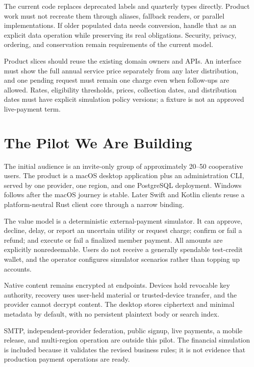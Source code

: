 \documentclass[11pt]{article}
\begin{document}
The current code replaces deprecated labels and quarterly types directly.
Product work must not recreate them through aliases, fallback readers, or parallel
implementations. If older populated data needs conversion, handle that as an
explicit data operation while preserving its real obligations. Security, privacy,
ordering, and conservation remain requirements of the current model.

Product slices should reuse the existing domain owners and APIs. An interface
must show the full annual service price separately from any later distribution,
and one pending request must remain one charge even when follow-ups are allowed.
Rates, eligibility thresholds, prices, collection dates, and distribution dates must have explicit simulation
policy versions; a fixture is not an approved live-payment term.

\section{The Pilot We Are Building}

The initial audience is an invite-only group of approximately 20--50 cooperative
users. The product is a macOS desktop application plus an administration CLI,
served by one provider, one region, and one PostgreSQL deployment. Windows follows
after the macOS journey is stable. Later Swift and Kotlin clients reuse a
platform-neutral Rust client core through a narrow binding.

The value model is a deterministic external-payment simulator. It can approve,
decline, delay, or report an uncertain utility or request charge; confirm or fail a refund;
and execute or fail a finalized member payment. All amounts are explicitly
nonredeemable. Users do not receive a generally spendable test-credit wallet,
and the operator configures simulator scenarios rather than topping up accounts.

Native content remains encrypted at endpoints. Devices hold revocable key
authority, recovery uses user-held material or trusted-device transfer, and the
provider cannot decrypt content. The desktop stores ciphertext and minimal
metadata by default, with no persistent plaintext body or search index.

SMTP, independent-provider federation, public signup, live payments, a mobile
release, and multi-region operation are outside this pilot. The financial
simulation is included because it validates the revised business rules; it is
not evidence that production payment operations are ready.
\end{document}
